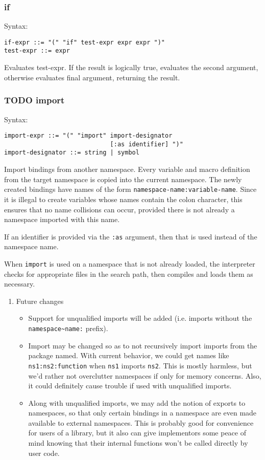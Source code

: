\documentclass[11pt]{article}
\begin{document}
\subsubsection{if}
\label{sec:org4e4e8bd}
Syntax:
\begin{verbatim}
if-expr ::= "(" "if" test-expr expr expr ")"
test-expr ::= expr
\end{verbatim}

Evaluates test-expr. If the result is logically true, evaluates the second
argument, otherwise evaluates final argument, returning the result.

\subsubsection{{\bfseries\sffamily TODO} import}
\label{sec:org4dec73f}
Syntax:
\begin{verbatim}
import-expr ::= "(" "import" import-designator
                             [:as identifier] ")"
import-designator ::= string | symbol
\end{verbatim}

Import bindings from another namespace. Every variable and macro definition from
the target namespace is copied into the current namespace. The newly created
bindings have names of the form \texttt{namespace-name:variable-name}. Since it is
illegal to create variables whose names contain the colon character, this
ensures that no name collisions can occur, provided there is not already a
namespace imported with this name.

If an identifier is provided via the \texttt{:as} argument, then that is used instead of
the namespace name.

When \texttt{import} is used on a namespace that is not already loaded, the interpreter
checks for appropriate files in the search path, then compiles and loads them as
necessary.

\begin{enumerate}
\item Future changes
\label{sec:org670e3b5}

\begin{itemize}
\item Support for unqualified imports will be added (i.e. imports without the \texttt{namespace\textasciitilde{}name:}
prefix).
\item Import may be changed so as to not recursively import imports from the package
named. With current behavior, we could get names like \texttt{ns1:ns2:function} when
\texttt{ns1} imports \texttt{ns2}. This is mostly harmless, but we'd rather not overclutter
namespaces if only for memory concerns. Also, it could definitely cause
trouble if used with unqualified imports.
\item Along with unqualified imports, we may add the notion of exports to
namespaces, so that only certain bindings in a namespace are even made
available to external namespaces. This is probably good for convenience for
users of a library, but it also can give implementors some peace of mind
knowing that their internal functions won't be called directly by user code.
\end{itemize}
\end{enumerate}
\end{document}
